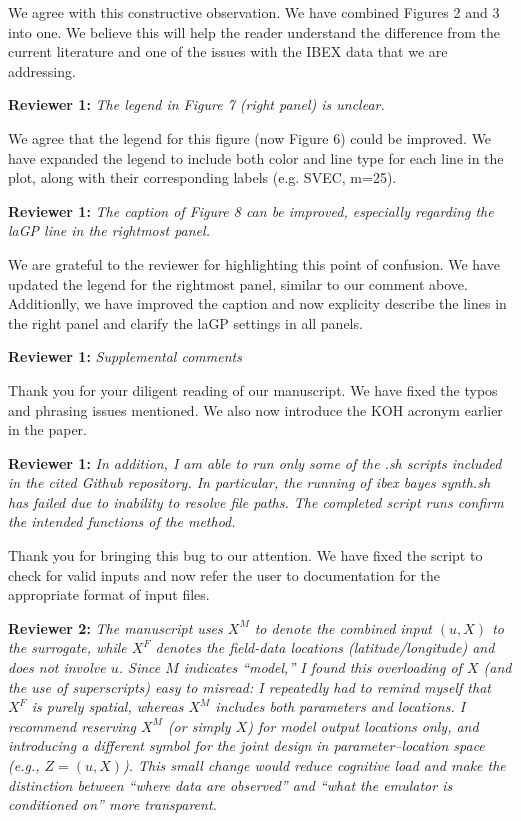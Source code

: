 \documentclass[12pt]{article}
\begin{document}
\bigskip
\noindent
We agree with this constructive observation. We have combined Figures 2 and 3
into one. We believe this will help the reader understand the difference from
the current literature and one of the issues with the IBEX data that we are
addressing.

\bigskip
\noindent
\textbf{Reviewer 1:} \textit{The legend in Figure 7 (right panel) is unclear.}

\bigskip
\noindent
We agree that the legend for this figure (now Figure 6) could be improved. We
have expanded the legend to include both color and line type for each line in
the plot, along with their corresponding labels (e.g. SVEC, m=25).

\bigskip
\noindent
\textbf{Reviewer 1:} \textit{The caption of Figure 8 can be improved,
especially regarding the laGP line in the rightmost panel.}

\bigskip
\noindent
We are grateful to the reviewer for highlighting this point of confusion. We
have updated the legend for the rightmost panel, similar to our comment above.
Additionlly, we have improved the caption and now explicity describe the lines
in the right panel and clarify the laGP settings in all panels.

\bigskip
\noindent
\textbf{Reviewer 1:} \textit{Supplemental comments}

\bigskip
\noindent
Thank you for your diligent reading of our manuscript. We have fixed the typos
and phrasing issues mentioned. We also now introduce the KOH acronym earlier
in the paper.

\bigskip
\noindent
\textbf{Reviewer 1:} \textit{In addition, I am able to run only some of the
.sh scripts included in the cited Github repository. In particular, the
running of ibex bayes synth.sh has failed due to inability to resolve file
paths. The completed script runs confirm the intended functions of the
method.}

\bigskip
\noindent
Thank you for bringing this bug to our attention. We have fixed the script to
check for valid inputs and now refer the user to documentation for the
appropriate format of input files.

\bigskip
\noindent
\textbf{Reviewer 2:} \textit{The manuscript uses \(X^M\) to denote the
combined input \((u, X)\) to the surrogate, while \(X^F\) denotes the
field-data locations (latitude/longitude) and does not involve \(u\). Since
\(M\) indicates ``model,'' I found this overloading of \(X\) (and the use of
superscripts) easy to misread: I repeatedly had to remind myself that \(X^F\)
is purely spatial, whereas \(X^M\) includes both parameters and locations. I
recommend reserving \(X^M\) (or simply \(X\)) for model output locations only,
and introducing a different symbol for the joint design in parameter–location
space (e.g., \(Z=(u,X)\)). This small change would reduce cognitive load and
make the distinction between ``where data are observed'' and ``what the emulator
is conditioned on'' more transparent.}
\end{document}
